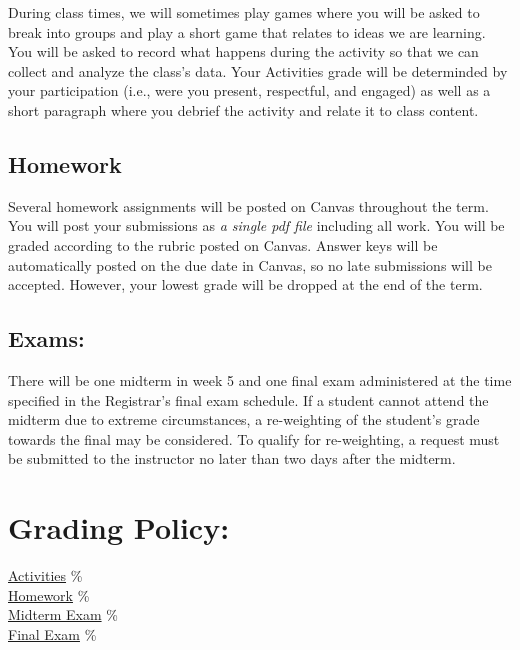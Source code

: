   During class times, we will sometimes play games where you will be asked to break into groups and play a short game that relates to ideas we are learning.
  You will be asked to record what happens during the activity so that we can collect and analyze the class's data.
  Your Activities grade will be determinded by your participation (i.e., were you present, respectful, and engaged) as well as a short paragraph where you debrief the activity and relate it to class content.

  \hypertarget{grading_HW}{\subsection{Homework}}

  Several homework assignments will be posted on Canvas throughout the term. You will post your submissions as \textit{a single pdf file} including all work. You will be graded according to the rubric posted on Canvas. 
  Answer keys will be automatically posted on the due date in Canvas, so no late submissions will be accepted. However, your lowest grade will be dropped at the end of the term.

 
\hypertarget{grading_exam}{\subsection{Exams:}}
  There will be one midterm in week 5 and one final exam administered at the time specified in the Registrar’s final exam schedule.
  If a student cannot attend the midterm due to extreme circumstances, a re-weighting of the student’s grade towards the final may be considered.
  To qualify for re-weighting, a request must be submitted to the instructor no later than two days after the midterm.

\section{Grading Policy:} 

\begin{center}\begin{minipage}{3.8in}\begin{flushleft}
    \hyperlink{grading_activity}{Activities} \% \\
    \hyperlink{grading_HW}{Homework}         \% \\
    \hyperlink{grading_exam}{Midterm Exam}   \% \\
    \hyperlink{grading_exam}{Final Exam}     \% \\
\end{flushleft}\end{minipage}\end{center}

